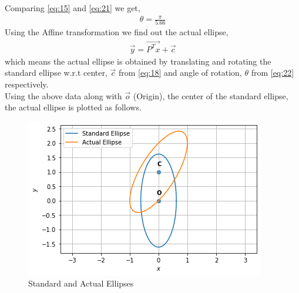 \documentclass[journal,12pt,twocolumn]{IEEEtran}
\begin{document}
Comparing \eqref{eq:15} and \eqref{eq:21} we get,
\begin{align}
\theta = \frac{\pi}{5.66} \label{eq:22}  
\end{align}
Using the Affine transformation we find out the actual ellipse,
\begin{align}
\vec{y} = \vec{P^Tx} + \vec{c}     
\end{align}
which means the actual ellipse is obtained by translating and rotating the standard ellipse w.r.t center, $\vec{c}$ from \eqref{eq:18} and angle of rotation, $\theta$ from \eqref{eq:22} respectively.\\
Using the above data along with $\vec{o}$ (Origin), the center of the standard ellipse, the actual ellipse is plotted as follows.  
\begin{figure}[!ht]
    \includegraphics[width=\columnwidth]{Figure.png}
    \caption{Standard and Actual Ellipses}
    \label{Fig.1}
\end{figure}
\end{document}
